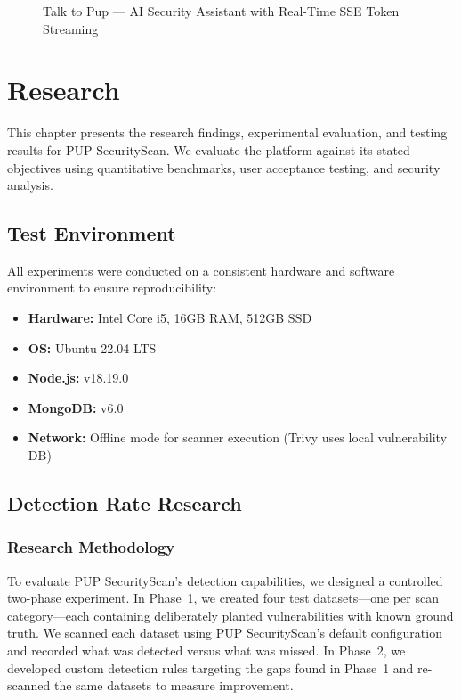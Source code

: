\documentclass[12pt,a4paper]{report}
\begin{document}
\begin{figure}[H]
\centering
\fbox{\rule{0pt}{5cm}\rule{0.95\textwidth}{0pt}}
\caption{Talk to Pup --- AI Security Assistant with Real-Time SSE Token Streaming}
\label{fig:pup_chat}
\end{figure}

\chapter{Research}
\label{chap:research}

This chapter presents the research findings, experimental evaluation, and testing results for PUP SecurityScan. We evaluate the platform against its stated objectives using quantitative benchmarks, user acceptance testing, and security analysis.

\section{Test Environment}

All experiments were conducted on a consistent hardware and software environment to ensure reproducibility:
\begin{itemize}
    \item \textbf{Hardware:} Intel Core i5, 16GB RAM, 512GB SSD
    \item \textbf{OS:} Ubuntu 22.04 LTS
    \item \textbf{Node.js:} v18.19.0
    \item \textbf{MongoDB:} v6.0
    \item \textbf{Network:} Offline mode for scanner execution (Trivy uses local vulnerability DB)
\end{itemize}

\section{Detection Rate Research}

\subsection{Research Methodology}

To evaluate PUP SecurityScan's detection capabilities, we designed a controlled two-phase experiment. In Phase~1, we created four test datasets---one per scan category---each containing deliberately planted vulnerabilities with known ground truth. We scanned each dataset using PUP SecurityScan's default configuration and recorded what was detected versus what was missed. In Phase~2, we developed custom detection rules targeting the gaps found in Phase~1 and re-scanned the same datasets to measure improvement.
\end{document}
